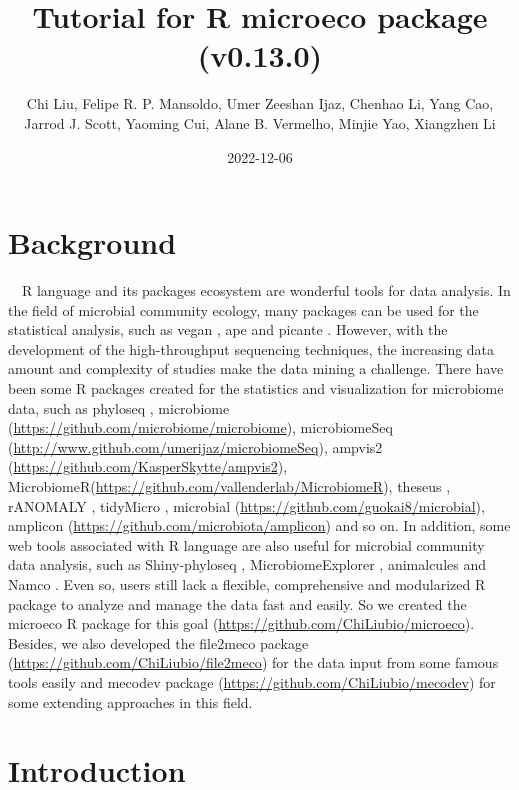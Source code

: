\documentclass[
]{book}
\title{Tutorial for R microeco package (v0.13.0)}
\author{Chi Liu, Felipe R. P. Mansoldo, Umer Zeeshan Ijaz, Chenhao Li, Yang Cao, Jarrod J. Scott, Yaoming Cui, Alane B. Vermelho, Minjie Yao, Xiangzhen Li}
\date{2022-12-06}
\begin{document}
\maketitle

{
\setcounter{tocdepth}{1}
\tableofcontents
}
\hypertarget{background}{%
\chapter{Background}\label{background}}

　R language \citep{R-base} and its packages ecosystem are wonderful tools for data analysis.
In the field of microbial community ecology, many packages can be used for the statistical analysis,
such as vegan \citep{Jari_vegan_2019}, ape \citep{Paradis_ape_2018} and picante \citep{Picante_Kembel_2010}.
However, with the development of the high-throughput sequencing techniques,
the increasing data amount and complexity of studies make the data mining a challenge.
There have been some R packages created for the statistics and visualization for microbiome data,
such as phyloseq \citep{Mcmurdie_phyloseq_2013},
microbiome (\url{https://github.com/microbiome/microbiome}), microbiomeSeq (\url{http://www.github.com/umerijaz/microbiomeSeq}),
ampvis2 (\url{https://github.com/KasperSkytte/ampvis2}), MicrobiomeR(\url{https://github.com/vallenderlab/MicrobiomeR}),
theseus \citep{Price_theseus_2018}, rANOMALY \citep{Theil_rANOMALY_2021},
tidyMicro \citep{Carpenter_tidyMicro_2021}, microbial (\url{https://github.com/guokai8/microbial}),
amplicon (\url{https://github.com/microbiota/amplicon})
and so on.
In addition, some web tools associated with R language are also useful for microbial community data analysis,
such as Shiny-phyloseq \citep{McMurdie_Shiny_2015}, MicrobiomeExplorer \citep{Reeder_MicrobiomeExplorer_2021},
animalcules \citep{Zhao_animalcules_2021} and Namco \citep{Dietrich_Namco_2022}.
Even so, users still lack a flexible, comprehensive and modularized R package to analyze and manage the data fast and easily.
So we created the microeco R package \citep{Liu_microeco_2021} for this goal (\url{https://github.com/ChiLiubio/microeco}).
Besides, we also developed the file2meco package (\url{https://github.com/ChiLiubio/file2meco}) for the data input from some famous tools easily
and mecodev package (\url{https://github.com/ChiLiubio/mecodev}) for some extending approaches in this field.

\hypertarget{intro}{%
\chapter{Introduction}\label{intro}}
\end{document}
